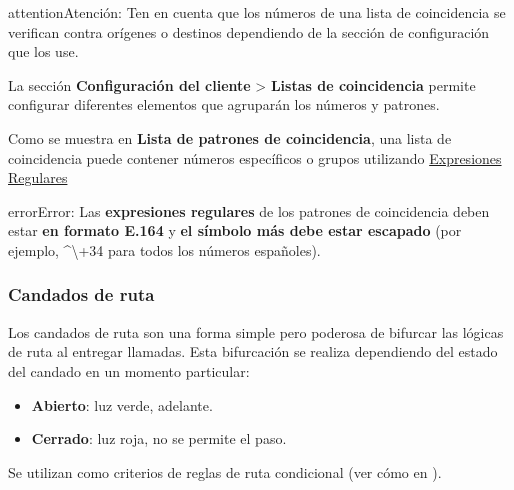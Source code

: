 \documentclass[letterpaper,10pt,spanish]{sphinxmanual}
\begin{document}
\begin{notice}{attention}{Atención:}
Ten en cuenta que los números de una lista de coincidencia se verifican contra orígenes o destinos dependiendo de la sección de configuración que los use.
\end{notice}

La sección \textbf{Configuración del cliente} \textgreater{} \textbf{Listas de coincidencia} permite configurar diferentes elementos que agruparán los números y patrones.

Como se muestra en \textbf{Lista de patrones de coincidencia}, una lista de coincidencia puede contener números específicos o grupos utilizando \href{http://php.net/manual/en/reference.pcre.pattern.syntax.php}{Expresiones Regulares}

\begin{notice}{error}{Error:}
Las \textbf{expresiones regulares} de los patrones de coincidencia deben estar \textbf{en formato E.164} y \textbf{el símbolo más debe estar escapado} (por ejemplo, \textasciicircum{}\textbackslash{}+34 para todos los números españoles).
\end{notice}
\label{administration_portal/client/vpbx/routing_tools/route_locks:route-locks}

\subsubsection{Candados de ruta}
\label{administration_portal/client/vpbx/routing_tools/route_locks:id2}\label{administration_portal/client/vpbx/routing_tools/route_locks:route-locks}\label{administration_portal/client/vpbx/routing_tools/route_locks::doc}\label{administration_portal/client/vpbx/routing_tools/route_locks:id1}
Los candados de ruta son una forma simple pero poderosa de bifurcar las lógicas de ruta al entregar llamadas. Esta bifurcación se realiza dependiendo del estado del candado en un momento particular:
\begin{itemize}
\item {} 
\textbf{Abierto}: luz verde, adelante.

\item {} 
\textbf{Cerrado}: luz roja, no se permite el paso.

\end{itemize}

Se utilizan como criterios de reglas de ruta condicional (ver cómo en {\hyperref[administration_portal/client/vpbx/routing_endpoints/conditional_routes:conditional\string-routes]{}}).
\end{document}
